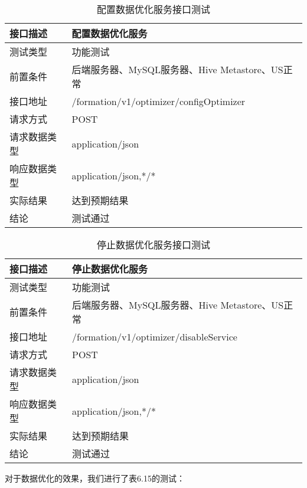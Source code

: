 \begin{table}[h]
  \centering
  \caption{配置数据优化服务接口测试}
  \label{tab:exampletable}
  \begin{tabular}{ll}
    \toprule
    接口描述         & 配置数据优化服务         \\
    \midrule
    测试类型         & 功能测试         \\
    前置条件         & 后端服务器、MySQL服务器、Hive Metastore、US正常         \\
    接口地址       & /formation/v1/optimizer/configOptimizer        \\
    请求方式         & POST      \\
    请求数据类型         & application/json     \\
    响应数据类型         & application/json,*/*           \\
    实际结果         & 达到预期结果           \\
    结论            & 测试通过           \\
    \bottomrule
  \end{tabular}
\end{table}

\begin{table}[h]
  \centering
  \caption{停止数据优化服务接口测试}
  \label{tab:exampletable}
  \begin{tabular}{ll}
    \toprule
    接口描述         & 停止数据优化服务         \\
    \midrule
    测试类型         & 功能测试         \\
    前置条件         & 后端服务器、MySQL服务器、Hive Metastore、US正常         \\
    接口地址       & /formation/v1/optimizer/disableService        \\
    请求方式         & POST      \\
    请求数据类型         & application/json     \\
    响应数据类型         & application/json,*/*           \\
    实际结果         & 达到预期结果           \\
    结论            & 测试通过           \\
    \bottomrule
  \end{tabular}
\end{table}

对于数据优化的效果，我们进行了表6.15的测试：


